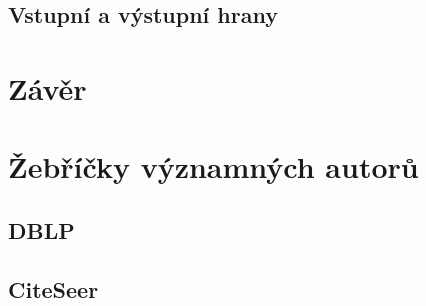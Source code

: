 \documentclass[12pt,titlepage]{report}
\begin{document}
\section{Vstupní a výstupní hrany}

\chapter{Závěr}




\newpage
\appendix
\chapter{Žebříčky významných autorů}
\label{chapter:zebricky}

\newpage
\section{DBLP}
\begin{footnotesize}











\end{footnotesize}

\section{CiteSeer}
\begin{footnotesize}
\end{footnotesize}
\end{document}
